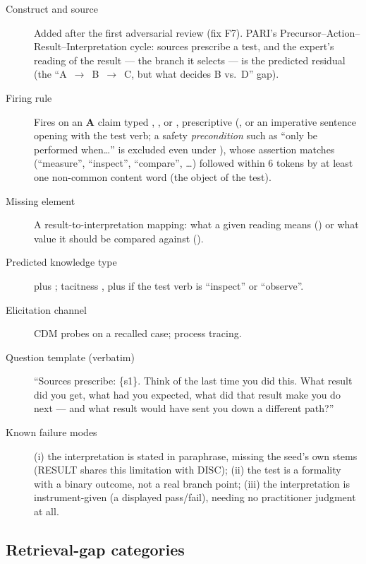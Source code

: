 \begin{description}
  \item[Construct and source] Added after the first adversarial review (fix F7). PARI's
    Precursor--Action--Result--Interpretation cycle: sources prescribe a test, and the expert's
    reading of the result --- the branch it selects --- is the predicted residual (the
    \enquote{A~$\to$~B~$\to$~C, but what decides B vs.\ D} gap).
  \item[Firing rule] Fires on an \textbf{A} claim typed , ,
     or , prescriptive (, or an imperative sentence
    opening with the test verb; a safety \emph{precondition} such as \enquote{only be performed
    when\ldots} is excluded even under ), whose assertion matches 
    (\enquote{measure}, \enquote{inspect}, \enquote{compare}, \ldots) followed within 6 tokens by
    at least one non-common content word (the object of the test).
  \item[Missing element] A result-to-interpretation mapping: what a given reading means
    () or what value it should be compared against ().
  \item[Predicted knowledge type]  plus ; tacitness
    , plus  if the test verb is \enquote{inspect} or
    \enquote{observe}.
  \item[Elicitation channel] CDM probes on a recalled case; process tracing.
  \item[Question template (verbatim)] \enquote{Sources prescribe: \textquotedbl\{s1\}\textquotedbl.
    Think of the last time you did this. What result did you get, what had you expected, what did
    that result make you do next --- and what result would have sent you down a different path?}
  \item[Known failure modes] (i) the interpretation is stated in paraphrase, missing the seed's own
    stems (RESULT shares this limitation with DISC); (ii) the test is a formality with a binary
    outcome, not a real branch point; (iii) the interpretation is instrument-given (a displayed
    pass/fail), needing no practitioner judgment at all.
\end{description}

\subsection{Retrieval-gap categories}

